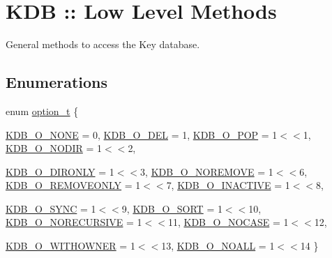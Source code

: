 \hypertarget{group__kdb}{
\section{KDB :: Low Level Methods}
\label{group__kdb}
}


General methods to access the Key database.  


\subsection*{Enumerations}
\begin{DoxyCompactItemize}
\item 
enum \hyperlink{group__kdb_ga98a3d6a4016c9dad9cbd1a99a9c2a45a}{option\_\-t} \{ \par
\hyperlink{group__kdb_gga98a3d6a4016c9dad9cbd1a99a9c2a45aa00738455e0ae843c8720809d8287f370}{KDB\_\-O\_\-NONE} = 0, 
\hyperlink{group__kdb_gga98a3d6a4016c9dad9cbd1a99a9c2a45aa66a5380c120f25f28f49848c4a863ead}{KDB\_\-O\_\-DEL} = 1, 
\hyperlink{group__kdb_gga98a3d6a4016c9dad9cbd1a99a9c2a45aa52fb5f2cc86773d393da62bebebf7984}{KDB\_\-O\_\-POP} = 1$<$$<$1, 
\hyperlink{group__kdb_gga98a3d6a4016c9dad9cbd1a99a9c2a45aa1a70738b2126badb8db7b012c8a1c610}{KDB\_\-O\_\-NODIR} = 1$<$$<$2, 
\par
\hyperlink{group__kdb_gga98a3d6a4016c9dad9cbd1a99a9c2a45aa131e99d60253d0b887a1e5886f8aa96c}{KDB\_\-O\_\-DIRONLY} = 1$<$$<$3, 
\hyperlink{group__kdb_gga98a3d6a4016c9dad9cbd1a99a9c2a45aa7649f575c2eb0adeaf2c9173ae16e0e6}{KDB\_\-O\_\-NOREMOVE} = 1$<$$<$6, 
\hyperlink{group__kdb_gga98a3d6a4016c9dad9cbd1a99a9c2a45aaf6ed09cee8aa8cf0d6a0e318a7105440}{KDB\_\-O\_\-REMOVEONLY} = 1$<$$<$7, 
\hyperlink{group__kdb_gga98a3d6a4016c9dad9cbd1a99a9c2a45aa789926d8a8e15b029cf7dded4154bcda}{KDB\_\-O\_\-INACTIVE} = 1$<$$<$8, 
\par
\hyperlink{group__kdb_gga98a3d6a4016c9dad9cbd1a99a9c2a45aaa7d5265eacbb1590982b718f35443e2e}{KDB\_\-O\_\-SYNC} = 1$<$$<$9, 
\hyperlink{group__kdb_gga98a3d6a4016c9dad9cbd1a99a9c2a45aad9d03b36ee88ca5a774cc01b190c99b8}{KDB\_\-O\_\-SORT} = 1$<$$<$10, 
\hyperlink{group__kdb_gga98a3d6a4016c9dad9cbd1a99a9c2a45aa6adaa17b267027ce50e670bf8cc6e824}{KDB\_\-O\_\-NORECURSIVE} = 1$<$$<$11, 
\hyperlink{group__kdb_gga98a3d6a4016c9dad9cbd1a99a9c2a45aaa5586d229e048f816bf7982765442b86}{KDB\_\-O\_\-NOCASE} = 1$<$$<$12, 
\par
\hyperlink{group__kdb_gga98a3d6a4016c9dad9cbd1a99a9c2a45aab2ff402f5de9aa67b7f786fb715a7a31}{KDB\_\-O\_\-WITHOWNER} = 1$<$$<$13, 
\hyperlink{group__kdb_gga98a3d6a4016c9dad9cbd1a99a9c2a45aae8dd1961707e7d0c27228a3f98b0a94d}{KDB\_\-O\_\-NOALL} = 1$<$$<$14
 \}
\end{DoxyCompactItemize}
